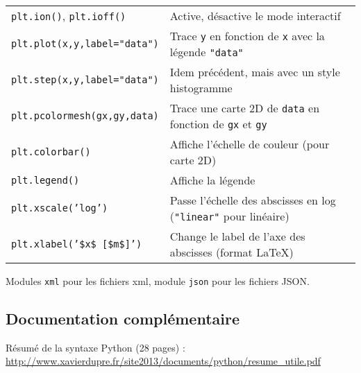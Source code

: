 \documentclass{article}
\begin{document}
\begin{tabular}{|l|l|}
    \texttt{plt.ion()}, \texttt{plt.ioff()}     & Active, désactive le mode interactif\\
    \texttt{plt.plot(x,y,label="data")}         & Trace \texttt{y} en fonction de \texttt{x} avec la légende \texttt{"data"}\\
    \texttt{plt.step(x,y,label="data")}         & Idem précédent, mais avec un style histogramme\\
    \texttt{plt.pcolormesh(gx,gy,data)}         & Trace une carte 2D de \texttt{data} en fonction de \texttt{gx} et \texttt{gy}\\
    \texttt{plt.colorbar()}                     & Affiche l'échelle de couleur (pour carte 2D)\\
    \texttt{plt.legend()}                       & Affiche la légende\\
    \texttt{plt.xscale('log')}                  & Passe l'échelle des abscisses en log (\texttt{"linear"} pour linéaire)\\
    \texttt{plt.xlabel('\$x\$ [\$m\$]')}        & Change le label de l'axe des abscisses (format LaTeX)\\
    \hline
\end{tabular}

Modules \texttt{xml} pour les fichiers xml, module \texttt{json} pour les fichiers JSON.

\subsection*{Documentation complémentaire}

Résumé de la syntaxe Python (28 pages) :\\ \url{http://www.xavierdupre.fr/site2013/documents/python/resume_utile.pdf}




\end{document}
